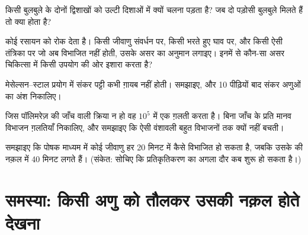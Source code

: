 \begin{exercise}[$\star\star$]\label{exo:g11:dna-replication:11}
किसी बुलबुले के दोनों द्विशाखों को उल्टी दिशाओं में क्यों चलना पड़ता है?
जब दो पड़ोसी बुलबुले मिलते हैं तो क्या होता है?
\end{exercise}

\begin{exercise}[$\star\star\star$]\label{exo:g11:dna-replication:12}
कोई रसायन  को रोक देता है। किसी जीवाणु संवर्धन पर, किसी भरते
हुए घाव पर, और किसी ऐसी तंत्रिका  पर जो अब विभाजित नहीं होती, उसके
असर का अनुमान लगाइए। इनमें से कौन-सा असर चिकित्सा में किसी उपयोग की ओर
इशारा करता है?
\end{exercise}

\begin{exercise}[$\star\star\star$]\label{exo:g11:dna-replication:13}
मेसेल्सन--स्टाल प्रयोग में संकर पट्टी कभी ग़ायब नहीं होती। समझाइए, और 10
पीढ़ियों बाद संकर अणुओं का अंश निकालिए।
\end{exercise}

\begin{exercise}[$\star\star\star$]\label{exo:g11:dna-replication:14}
जिस पॉलिमरेज़ की जाँच वाली क्रिया न हो वह $10^5$ में एक ग़लती करता है।
बिना जाँच के प्रति मानव  विभाजन ग़लतियाँ निकालिए, और समझाइए कि ऐसी
 वंशावली बहुत विभाजनों तक क्यों नहीं बचती।
\end{exercise}

\begin{exercise}[$\star\star\star$]\label{exo:g11:dna-replication:15}
समझाइए कि पोषक माध्यम में कोई जीवाणु हर 20 मिनट में कैसे विभाजित हो सकता
है, जबकि उसके  की नक़ल में 40 मिनट लगते हैं। (संकेत: सोचिए कि
प्रतिकृतिकरण का अगला दौर कब शुरू हो सकता है।)
\end{exercise}

\section{समस्या: किसी अणु को तौलकर उसकी नक़ल होते देखना}

